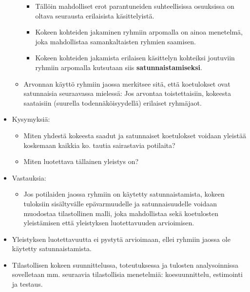 \documentclass[
]{book}
\providecommand{\tightlist}{%
  \setlength{\itemsep}{0pt}\setlength{\parskip}{0pt}}
\begin{document}
\begin{eblock}{}
\begin{itemize}
\begin{itemize}
    \begin{itemize}
    \tightlist
    \item
      Tällöin mahdolliset erot parantuneiden suhteellisissa osuuksissa on oltava seurausta erilaisista käsittelyistä.
    \item
      Kokeen kohteiden jakaminen ryhmiin arpomalla on ainoa menetelmä, joka mahdollistaa samankaltaisten ryhmien saamisen.
    \item
      Kokeen kohteiden jakamista erilaisen käsittelyn kohteiksi joutuviin ryhmiin arpomalla kutsutaan siis \textbf{satunnaistamiseksi}.
    \end{itemize}
  \item
    Arvonnan käyttö ryhmiin jaossa merkitsee sitä, että koetulokset ovat satunnaisia seuraavassa mielessä: Jos arvontaa toistettaisiin, kokeesta saataisiin (suurella todennäköisyydellä) erilaiset ryhmäjaot.
  \end{itemize}
\item
  Kysymyksiä:

  \begin{itemize}
  \tightlist
  \item
    Miten yhdestä kokeesta saadut ja satunnaiset koetulokset voidaan yleistää koskemaan kaikkia ko. tautia sairastavia potilaita?
  \item
    Miten luotettava tällainen yleistys on?
  \end{itemize}
\item
  Vastauksia:

  \begin{itemize}
  \tightlist
  \item
    Jos potilaiden jaossa ryhmiin on käytetty satunnaistamista, kokeen tuloksiin sisältyvälle epävarmuudelle ja satunnaisuudelle voidaan muodostaa tilastollinen malli, joka mahdollistaa sekä koetulosten yleistämisen että yleistyksen luotettavuuden arvioimisen.
  \end{itemize}
\item
  Yleistyksen luotettavuutta ei pystytä arvioimaan, ellei ryhmiin jaossa ole käytetty satunnaistamista.
\item
  Tilastollisen kokeen suunnittelussa, toteutuksessa ja tulosten analysoinnissa sovelletaan mm. seuraavia tilastollisia menetelmiä: koesuunnittelu, estimointi ja testaus.
\end{itemize}

\end{eblock}

\hfill\break
\end{document}
